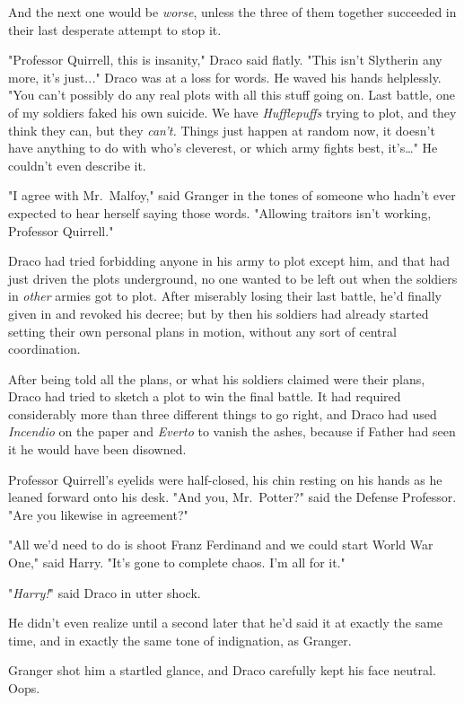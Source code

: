 And the next one would be \emph{worse}, unless the three of them together 
succeeded in their last desperate attempt to stop it.

"Professor Quirrell, this is insanity," Draco said flatly. "This isn't 
Slytherin any more, it's just..\emph{.}" Draco was at a loss for words. He 
waved his hands helplessly. "You can't possibly do any real plots with all this 
stuff going on. Last battle, one of my soldiers faked his own suicide. We have 
\emph{Hufflepuffs} trying to plot, and they think they can, but they 
\emph{can't.} Things just happen at random now, it doesn't have anything to do 
with who's cleverest, or which army fights best, it's{\ldots}" He couldn't even 
describe it.

"I agree with Mr.~Malfoy," said Granger in the tones of someone who hadn't ever 
expected to hear herself saying those words. "Allowing traitors isn't working, 
Professor Quirrell."

Draco had tried forbidding anyone in his army to plot except him, and that had 
just driven the plots underground, no one wanted to be left out when the 
soldiers in \emph{other} armies got to plot. After miserably losing their last 
battle, he'd finally given in and revoked his decree; but by then his soldiers 
had already started setting their own personal plans in motion, without any 
sort of central coordination.

After being told all the plans, or what his soldiers claimed were their plans, 
Draco had tried to sketch a plot to win the final battle. It had required 
considerably more than three different things to go right, and Draco had used 
\emph{Incendio} on the paper and \emph{Everto} to vanish the ashes, because if 
Father had seen it he would have been disowned.

Professor Quirrell's eyelids were half-closed, his chin resting on his hands as 
he leaned forward onto his desk. "And you, Mr.~Potter?" said the Defense 
Professor. "Are you likewise in agreement?"

"All we'd need to do is shoot Franz Ferdinand and we could start World War 
One," said Harry. "It's gone to complete chaos. I'm all for it."

"\emph{Harry!}" said Draco in utter shock.

He didn't even realize until a second later that he'd said it at exactly the 
same time, and in exactly the same tone of indignation, as Granger.

Granger shot him a startled glance, and Draco carefully kept his face neutral. 
Oops.

